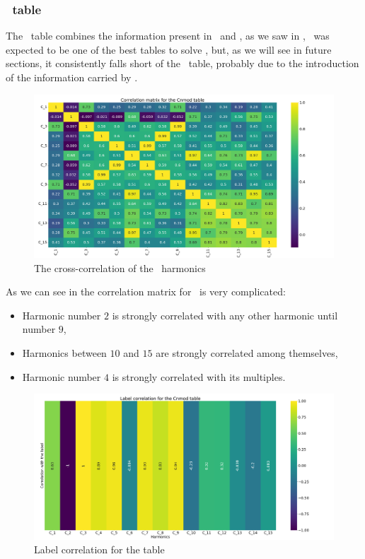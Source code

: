 \subsubsection{\cnmod\ table}
The \cnmod\ table combines the information present in \an\ and \bn, as we saw in ,
\cnmod\ was expected to be one of the best tables to solve \qrp, but, as we will see in future
sections, it consistently falls short of the \an\ table, probably due to the introduction of the information carried by \bn.
\begin{figure}[h!]
	\centering
	\includegraphics[width=\linewidth]{img/Cnmod_corr_matrix.png}
	\caption{The cross-correlation of the \cnmod\ harmonics} \label{fig:cnmod-corr}
\end{figure}

As we can see in  the correlation matrix for \cnmod\ is very complicated:
\begin{itemize}
	\item Harmonic number $2$ is strongly correlated with any other harmonic until number $9$,
	\item Harmonics between $10$ and $15$ are strongly correlated among themselves,
	\item Harmonic number $4$ is strongly correlated with its multiples.
\end{itemize}
\begin{figure}[h!]
	\centering
	\includegraphics[width=\linewidth]{img/Cnmod_label_corr.png}
	\caption{Label correlation for the \cnmod table} \label{fig:cnmod-lcorr}
\end{figure}

